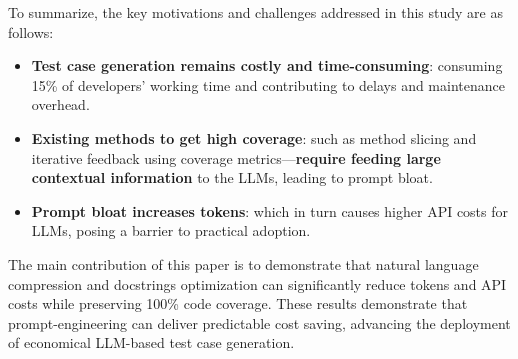 To summarize, the key motivations and challenges addressed in this study are as follows:

\begin{itemize}[label={$\bullet$}]
    \item \textbf{Test case generation remains costly and time-consuming}: consuming 15\% of developers’ working time and contributing to delays and maintenance overhead.
    \vspace{0.2cm}
    
    \item \textbf{Existing methods to get high coverage}: such as method slicing and iterative feedback using coverage metrics—\textbf{require feeding large contextual information} to the LLMs, leading to prompt bloat.
    \vspace{0.2cm}
    
    \item \textbf{Prompt bloat increases tokens}: which in turn causes higher API costs for LLMs, posing a barrier to practical adoption.
\end{itemize}

The main contribution of this paper is to demonstrate that natural language compression and docstrings optimization can significantly reduce tokens and API costs while preserving 100\% code coverage. These results demonstrate that prompt-engineering can deliver predictable cost saving, advancing the deployment of economical LLM-based test case generation.
